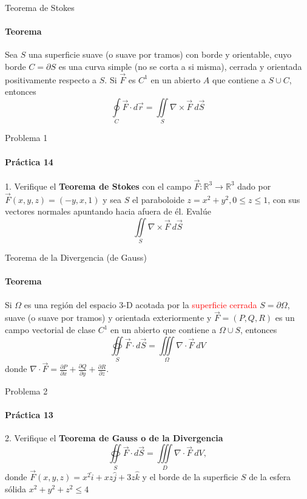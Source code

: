 \documentclass{plantillaPPT}
\begin{document}
\primeraDiapo

\begin{frame}{Teorema de Stokes}
\framesubtitle{Teorema}
    \begin{teorema}
        Sea $S$ una superficie suave (o suave por tramos) con borde y orientable, cuyo borde $C=\partial S$ es una curva simple (no se corta a si misma), cerrada y orientada positivamente respecto a $S$.
        Si $\vec{F}$ es $C^1$ en un abierto $A$ que contiene a $S\cup C$, entonces
        \[
        \oint\limits_C \vec{F}\cdot d\vec{r} = \iint\limits_S \nabla\times\vec{F}~d\vec{S}
        \]
    \end{teorema}
    
\end{frame}

\begin{frame}{Problema 1}
    \framesubtitle{Práctica 14}
    1. Verifique el \textbf{Teorema de Stokes} con el campo $\vec{F}:\mathbb{R}^3\to\mathbb{R}^3$ dado por $\vec{F}(x,y,z) = (-y,x,1)$ y sea $S$ el paraboloide $z=x^2+y^2, 0\leq z\leq1$, con sus vectores normales apuntando hacia afuera de él. Evalúe
    \[
    \iint\limits_S \nabla\times\vec{F}~d\vec{S}
    \]
\end{frame}
\begin{frame}{Teorema de la Divergencia (de Gauss)}
    \framesubtitle{Teorema}
    \begin{teorema}
        Si $\Omega$ es una región del espacio 3-D acotada por la \textcolor{red}{superficie cerrada} $S=\partial\Omega$, suave (o suave por tramos) y orientada exteriormente y $\vec{F}= (P,Q,R)$ es un campo vectorial de clase $C^1$ en un abierto que contiene a $\Omega\cup S$, entonces
        \[
        \oiint\limits_S \vec{F}\cdot d\vec{S} = \iiint\limits_\Omega \nabla\cdot\vec{F}~dV
        \]
        donde {\color{blue} $\nabla\cdot\vec{F} = \frac{\partial P}{\partial x}+\frac{\partial Q}{\partial y}+\frac{\partial R}{\partial z}$}.
    \end{teorema}
    
\end{frame}
\begin{frame}{Problema 2}
    \framesubtitle{Práctica 13}
    2. Verifique el \textbf{Teorema de Gauss o de la Divergencia}
    \[
    \oiint\limits_S \vec{F}\cdot d\vec{S} = \iiint\limits_D \nabla\cdot\vec{F}~dV,
    \]
donde $\vec{F}(x,y,z) = x^2\hat{i}+xz\hat{j}+3z\hat{k}$ y el borde de la superficie $S$ de la esfera sólida $x^2+y^2+z^2\leq4$
\end{frame}
\end{document}

